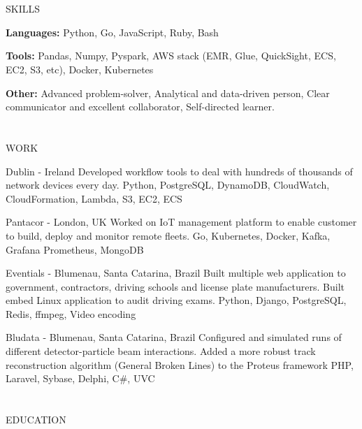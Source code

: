 \documentclass{my_cv}
\begin{document}
\begin{multicols}{2}

\section{\faList}{SKILLS}

\textbf{Languages:} Python, Go, JavaScript, Ruby, Bash

\noindent\textbf{Tools:} Pandas, Numpy, Pyspark, AWS stack (EMR, Glue, QuickSight, ECS, EC2, S3, etc), Docker, Kubernetes

\noindent\textbf{Other:} Advanced problem-solver, Analytical and data-driven person, Clear communicator and excellent collaborator, Self-directed learner.

\section{\faPencil}{WORK}

%
    {Dublin - Ireland}%
    {Developed workflow tools to deal with hundreds of thousands of network devices every day.}
    {Python, PostgreSQL, DynamoDB, CloudWatch, CloudFormation, Lambda, S3, EC2, ECS}

%
    {Pantacor - London, UK}%
    {Worked on IoT management platform to enable customer to build, deploy and monitor remote fleets.}%
    {Go, Kubernetes, Docker, Kafka, Grafana Prometheus, MongoDB}

%
    {Eventials - Blumenau, Santa Catarina, Brazil}%
    {Built multiple web application to government, contractors, driving schools and license plate manufacturers. Built embed Linux application to audit driving exams.}%
    {Python, Django, PostgreSQL, Redis, ffmpeg, Video encoding}

%
    {Bludata - Blumenau, Santa Catarina, Brazil}%
    {Configured and simulated runs of different detector-particle beam interactions. Added a more robust track reconstruction algorithm (General Broken Lines) to the Proteus framework}
    {PHP, Laravel, Sybase, Delphi, C\#, UVC}%

\columnbreak

\section{\faGraduationCap}{EDUCATION}


\end{multicols}
\end{document}

